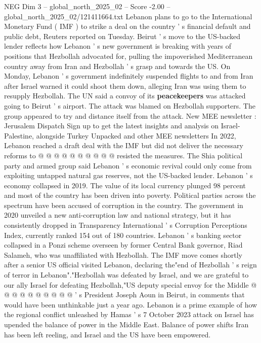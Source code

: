 \begin{textsample}{NEG Dim 3 – global\_north\_2025\_02 – Score -2.00 – global\_north\_2025\_02/121411664.txt}  \label{ex:f3_neg_161}
Lebanon plans to go to the International Monetary Fund ( IMF ) to strike a deal on the country ' s financial default and public debt, Reuters reported on Tuesday.
Beirut ' s move to the US-backed lender reflects how Lebanon ' s new government is breaking with years of positions that Hezbollah advocated for, pulling the impoverished Mediterranean country away from Iran and Hezbollah ' s grasp and towards the US.
On Monday, Lebanon ' s government indefinitely suspended flights to and from Iran after Israel warned it could shoot them down, alleging Iran was using them to resupply Hezbollah.
The UN said a convoy of its \textbf{peacekeepers} was attacked going to Beirut ' s airport.
The attack was blamed on Hezbollah supporters.
The group appeared to try and distance itself from the attack.
New MEE newsletter : Jerusalem Dispatch Sign up to get the latest insights and analysis on Israel-Palestine, alongside Turkey Unpacked and other MEE newsletters In 2022, Lebanon reached a draft deal with the IMF but did not deliver the necessary reforms to @ @ @ @ @ @ @ @ @ @ resisted the measures.
The Shia political party and armed group said Lebanon ' s economic revival could only come from exploiting untapped natural gas reserves, not the US-backed lender.
Lebanon ' s economy collapsed in 2019.
The value of its local currency plunged 98 percent and most of the country has been driven into poverty.
Political parties across the spectrum have been accused of corruption in the country.
The government in 2020 unveiled a new anti-corruption law and national strategy, but it has consistently dropped in Transparency International ' s Corruption Perceptions Index, currently ranked 154 out of 180 countries.
Lebanon ' s banking sector collapsed in a Ponzi scheme overseen by former Central Bank governor, Riad Salameh, who was unaffiliated with Hezbollah.
The IMF move comes shortly after a senior US official visited Lebanon, declaring the"end of Hezbollah ' s reign of terror in Lebanon"."Hezbollah was defeated by Israel, and we are grateful to our ally Israel for defeating Hezbollah,"US deputy special envoy for the Middle @ @ @ @ @ @ @ @ @ @ ' s President Joseph Aoun in Beirut, in comments that would have been unthinkable just a year ago.
Lebanon is a prime example of how the regional conflict unleashed by Hamas ' s 7 October 2023 attack on Israel has upended the balance of power in the Middle East.
Balance of power shifts Iran has been left reeling, and Israel and the US have been empowered.

\end{textsample}
